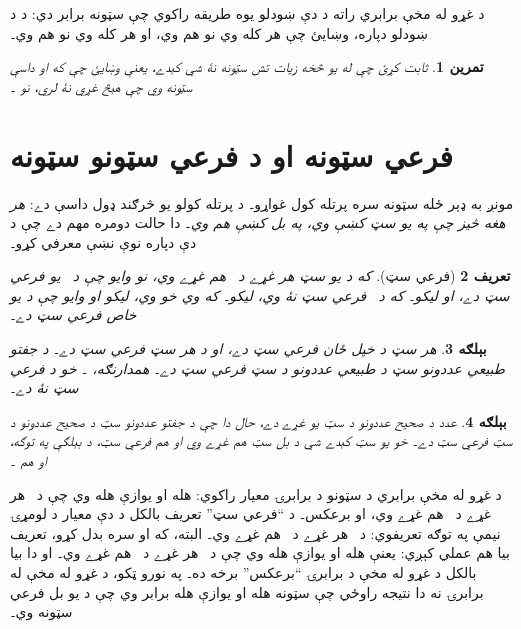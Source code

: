 \documentclass[12pt,a4paper]{article}
\newcommand{\olfileid}[3]{\gdef\pspart{#1}\gdef\pschapter{#2}\gdef\pssection{#3}}
\newcommand{\olsection}[1]{\section{#1}\label{\pspart:\pschapter:\pssection:sec}}
\newenvironment{explain}{}{}
\newtheorem{defn}{تعريف}[section]
\newtheorem{ex}[defn]{بېلګه}
\newtheorem{prob}[defn]{تمرين}
\begin{document}
د غړو له مخې برابري راته د دې ښودلو يوه طريقه راکوي چې سټونه برابر دي: د  د ښودلو دپاره، وښايئ چې هر کله  وي نو  هم وي، او هر کله  وي نو  هم وي۔

\begin{prob}
ثابت کړئ چې له يو څخه زيات تش سټونه نۀ شي کېدے، يعنې وښايئ چې که  او  داسې سټونه وي چې هېڅ غړي نۀ لري، نو ۔
\end{prob}



\olfileid{sfr}{set}{sub}
\olsection{فرعي سټونه او د فرعي سټونو سټونه}

\begin{explain}
مونږ به ډېر ځله سټونه سره پرتله کول غواړو۔ د پرتله کولو يو څرګند ډول داسې دے: \emph{هر هغه څيز چې په يو سټ کښې وي، په بل کښې هم وي}۔ دا حالت دومره مهم دے چې د دې دپاره نوې نښې معرفي کړو۔
\end{explain}

\begin{defn}[فرعي سټ]
که د يو سټ  هر غړے د~ هم غړے وي، نو وايو چې  د~ يو \emph{فرعي سټ} دے، او  ليکو۔ که  د~ فرعي سټ نۀ وي،  ليکو۔ که  وي خو  وي،  ليکو او وايو چې  د  يو \emph{خاص فرعي سټ} دے۔
\end{defn}

\begin{ex}
هر سټ د خپل ځان فرعي سټ دے، او \LR{$\emptyset$} د هر سټ فرعي سټ دے۔ د جفتو طبيعي عددونو سټ د طبيعي عددونو د سټ فرعي سټ دے۔ همدارنګه، ۔ خو  د  فرعي سټ نۀ دے۔
\end{ex}

\begin{ex}
عدد  د صحيح عددونو د سټ يو غړے دے، حال دا چې د جفتو عددونو سټ د صحيح عددونو د سټ فرعي سټ دے۔ خو يو سټ کېدے شي د بل سټ \emph{هم} غړے وي او هم فرعي سټ، د بېلګې په توګه،  او هم ۔
\end{ex}

د غړو له مخې برابري د سټونو د برابرۍ معيار راکوي:  هله او يوازې هله وي چې د~ هر غړے د~ هم غړے وي، او برعکس۔ د ``فرعي سټ'' تعريف  بالکل د دې معيار د لومړۍ نيمې په توګه تعريفوي: د~ هر غړے د~ هم غړے وي۔ البته، که  او  سره بدل کړو، تعريف بيا هم عملي کېږي: يعنې  هله او يوازې هله وي چې د~ هر غړے د~ هم غړے وي۔ او دا بيا بالکل د غړو له مخې د برابرۍ ``برعکس'' برخه ده۔ په نورو ټکو، د غړو له مخې له برابرۍ نه دا نتيجه راوځي چې سټونه هله او يوازې هله برابر وي چې د يو بل فرعي سټونه وي۔
\end{document}
